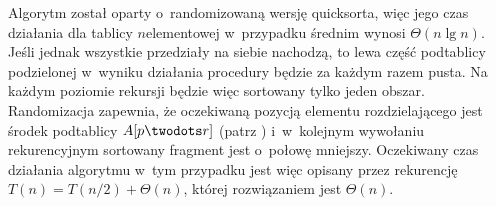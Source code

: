\subproblem %
Algorytm został oparty o~randomizowaną wersję quicksorta, więc jego czas działania dla tablicy $n$\nbhyphen elementowej w~przypadku średnim wynosi $\Theta(n\lg n)$.
Jeśli jednak wszystkie przedziały na siebie nachodzą, to lewa część podtablicy podzielonej w~wyniku działania procedury  będzie za każdym razem pusta.
Na każdym poziomie rekursji będzie więc sortowany tylko jeden obszar.
Randomizacja zapewnia, że oczekiwaną pozycją elementu rozdzielającego jest środek podtablicy $A[p\twodots r]$ (patrz ) i~w~kolejnym wywołaniu rekurencyjnym sortowany fragment jest o~połowę mniejszy.
Oczekiwany czas działania algorytmu w~tym przypadku jest więc opisany przez rekurencję $T(n)=T(n/2)+\Theta(n)$, której rozwiązaniem jest $\Theta(n)$.
